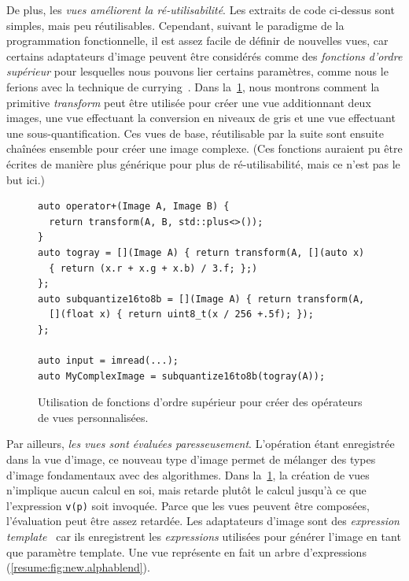 De plus, les \emph{vues améliorent la ré-utilisabilité}. Les extraits de code ci-dessus sont simples, mais peu
réutilisables. Cependant, suivant le paradigme de la programmation fonctionnelle, il est assez facile de définir de
nouvelles vues, car certains adaptateurs d'image peuvent être considérés comme des \emph{fonctions d'ordre supérieur}
pour lesquelles nous pouvons lier certains paramètres, comme nous le ferions avec la technique de
currying~\parencite{hanus.1995.curry}. Dans la~\cref{resume:fig:view.highorder}, nous montrons comment la primitive
\emph{transform} peut être utilisée pour créer une vue additionnant deux images, une vue effectuant la conversion en
niveaux de gris et une vue effectuant une sous-quantification. Ces vues de base, réutilisable par la suite sont ensuite
chaînées ensemble pour créer une image complexe. (Ces fonctions auraient pu être écrites de manière plus générique pour
plus de ré-utilisabilité, mais ce n'est pas le but ici.)

\begin{figure}
  \begin{verbatim}
auto operator+(Image A, Image B) {
  return transform(A, B, std::plus<>());
}
auto togray = [](Image A) { return transform(A, [](auto x)
  { return (x.r + x.g + x.b) / 3.f; };)
};
auto subquantize16to8b = [](Image A) { return transform(A,
  [](float x) { return uint8_t(x / 256 +.5f); });
};

auto input = imread(...);
auto MyComplexImage = subquantize16to8b(togray(A));
  \end{verbatim}

  \caption[]{Utilisation de fonctions d'ordre supérieur pour créer des opérateurs de vues personnalisées.}
  \label{resume:fig:view.highorder}
\end{figure}

Par ailleurs, \emph{les vues sont évaluées paresseusement}. L'opération étant enregistrée dans la vue d'image, ce
nouveau type d'image permet de mélanger des types d'image fondamentaux avec des algorithmes. Dans
la~\cref{resume:fig:view.highorder}, la création de vues n'implique aucun calcul en soi, mais retarde plutôt le calcul
jusqu'à ce que l'expression \texttt{v(p)} soit invoquée. Parce que les vues peuvent être composées, l'évaluation peut
être assez retardée. Les adaptateurs d'image sont des \emph{expression template}~\parencite{veldhuizen.1995.expression,
  veldhuizen.2000.blitz} car ils enregistrent les \emph{expressions} utilisées pour générer l'image en tant que paramètre
template. Une vue représente en fait un arbre d'expressions (\cref{resume:fig:new.alphablend}).

